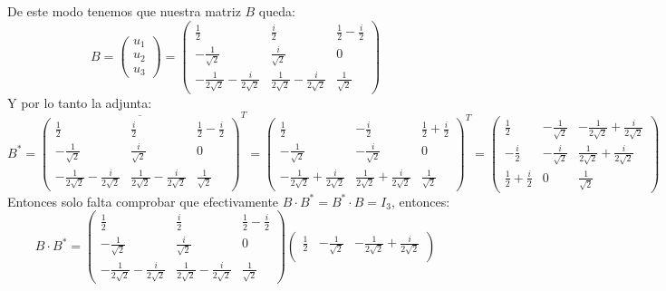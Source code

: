 \begin{itemize}
    De este modo tenemos que nuestra matriz $B$ queda:
    \[B=\begin{pmatrix}
       u_1\\u_2\\u_3
    \end{pmatrix}=\begin{pmatrix}
   \frac{1}{2} & \frac{i}{2} & \frac{1}{2}-\frac{i}{2}\\
    -\frac{1}{\sqrt{2}} & \frac{i}{\sqrt{2}} & 0\\
    -\frac{1}{2\sqrt{2}}-\frac{i}{2\sqrt{2}} & \frac{1}{2\sqrt{2}}-\frac{i}{2\sqrt{2}} & \frac{1}{\sqrt{2}}
    \end{pmatrix}\]
    Y por lo tanto la adjunta:
    \[B^*=\overline{\begin{pmatrix}
   \frac{1}{2} & \frac{i}{2} & \frac{1}{2}-\frac{i}{2}\\
    -\frac{1}{\sqrt{2}} & \frac{i}{\sqrt{2}} & 0\\
    -\frac{1}{2\sqrt{2}}-\frac{i}{2\sqrt{2}} & \frac{1}{2\sqrt{2}}-\frac{i}{2\sqrt{2}} & \frac{1}{\sqrt{2}}
    \end{pmatrix}}^T=\begin{pmatrix}
   \frac{1}{2} & -\frac{i}{2} & \frac{1}{2}+\frac{i}{2}\\
    -\frac{1}{\sqrt{2}} & -\frac{i}{\sqrt{2}} & 0\\
    -\frac{1}{2\sqrt{2}}+\frac{i}{2\sqrt{2}} & \frac{1}{2\sqrt{2}}+\frac{i}{2\sqrt{2}} & \frac{1}{\sqrt{2}}
    \end{pmatrix}^T=\begin{pmatrix}
   \frac{1}{2} & -\frac{1}{\sqrt{2}} & -\frac{1}{2\sqrt{2}}+\frac{i}{2\sqrt{2}}\\
    -\frac{i}{2} & -\frac{i}{\sqrt{2}} & \frac{1}{2\sqrt{2}}+\frac{i}{2\sqrt{2}}\\
    \frac{1}{2}+\frac{i}{2} & 0 & \frac{1}{\sqrt{2}}
    \end{pmatrix}\]
    Entonces solo falta comprobar que efectivamente $B\cdot B^*=B^*\cdot B=I_3$, entonces:
    \[B\cdot B^*=\begin{pmatrix}
   \frac{1}{2} & \frac{i}{2} & \frac{1}{2}-\frac{i}{2}\\
    -\frac{1}{\sqrt{2}} & \frac{i}{\sqrt{2}} & 0\\
    -\frac{1}{2\sqrt{2}}-\frac{i}{2\sqrt{2}} & \frac{1}{2\sqrt{2}}-\frac{i}{2\sqrt{2}} & \frac{1}{\sqrt{2}}
    \end{pmatrix}
    \begin{pmatrix}
   \frac{1}{2} & -\frac{1}{\sqrt{2}} & -\frac{1}{2\sqrt{2}}+\frac{i}{2\sqrt{2}}\\

\end{pmatrix}\]
\end{itemize}

